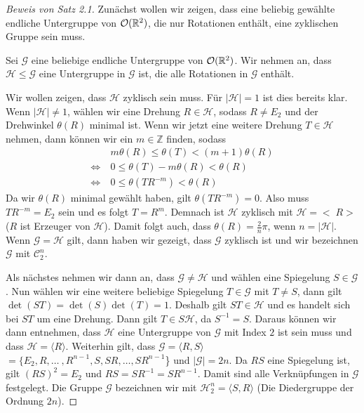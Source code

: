 \begin{proof}[Beweis von Satz 2.1]
	 Zunächst wollen wir zeigen, dass eine beliebig gewählte endliche Untergruppe von ${\mathcal{O}(\mathbb{R}^2)}$, die nur Rotationen enthält, eine zyklischen Gruppe sein muss. \par\smallskip  
	 Sei $\mathcal{G}$ eine beliebige endliche Untergruppe von ${\mathcal{O}(\mathbb{R}^2)}$. Wir nehmen an, dass $\mathcal{H} \leq \mathcal{G}$ eine Untergruppe in $\mathcal{G}$ ist, die alle Rotationen in $\mathcal{G}$ enthält. 
	 
	 Wir wollen zeigen, dass $\mathcal{H}$ zyklisch sein muss. Für $|\mathcal{H}|=1$ ist dies bereits klar. Wenn $|\mathcal{H}| \neq 1$, wählen wir eine Drehung $R \in \mathcal{H}$, sodass $R \neq E_2$ und der Drehwinkel $\theta(R)$ minimal ist. Wenn wir jetzt eine weitere Drehung $T \in \mathcal{H}$ nehmen, dann können wir ein $m \in \mathbb{Z}$ finden, sodass \begin{align*}
	 &m \theta(R)\leq\theta(T)<(m+1)\theta(R) \\
	 \Leftrightarrow \ &0 \leq \theta(T)-m\theta(R)<\theta(R) \\
	 \Leftrightarrow \ &0 \leq \theta(TR^{-m})<\theta(R)
\end{align*}
	 Da wir $\theta(R)$ minimal gewählt haben, gilt $\theta(TR^{-m})=0$. Also muss $TR^{-m}=E_2$ sein und es folgt $T=R^{m}$. Demnach ist $\mathcal{H}$ zyklisch mit $\mathcal{H}=<\;R\!>$ ($R$ ist Erzeuger von $\mathcal{H}$). Damit folgt auch, dass $\theta(R)=\frac{2}{n}\pi$, wenn $n=|\mathcal{H}|$. Wenn $\mathcal{G} = \mathcal{H}$ gilt, dann haben wir gezeigt, dass $\mathcal{G}$ zyklisch ist und wir bezeichnen $\mathcal{G}$ mit $\mathcal{C}^n_2$.
	 
	 Als nächstes nehmen wir dann an, dass $\mathcal{G} \neq \mathcal{H}$ und wählen eine Spiegelung $S \in \mathcal{G}$. Nun wählen wir eine weitere beliebige Spiegelung $T \in \mathcal{G}$ mit $T \neq S$, dann gilt $\det(ST)=\det(S)\det(T)=1$. Deshalb gilt $ST \in \mathcal{H}$ und es handelt sich bei $ST$ um eine Drehung. Dann gilt $T \in S\mathcal{H}$, da $S^{-1}=S$. Daraus können wir dann entnehmen, dass $\mathcal{H}$ eine Untergruppe von $\mathcal{G}$ mit Index $2$ ist sein muss und dass $\mathcal{H}=\langle R \rangle$. Weiterhin gilt, dass $\mathcal{G}=\langle R,S \rangle$ $=\{E_2,R,\dots \ ,R^{n-1},S,SR,\dots ,SR^{n-1}$\} und $|\mathcal{G}|=2n$. Da $RS$ eine Spiegelung ist, gilt $(RS)^2=E_2$ und $RS=SR^{-1}=SR^{n-1}$. Damit sind alle Verknüpfungen in $\mathcal{G}$ festgelegt. Die Gruppe $\mathcal{G}$ bezeichnen wir mit $\mathcal{H}^n_2=\langle S,R \rangle$ (Die Diedergruppe der Ordnung $2n$).
\end{proof}

